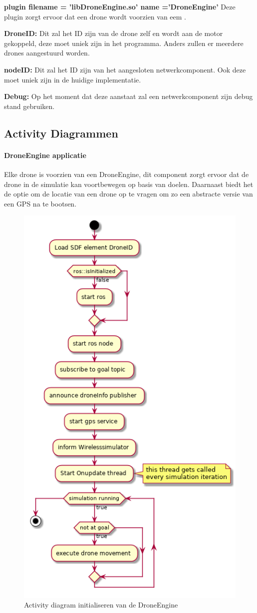 \documentclass[a4paper, 11pt, oneside]{report}
\begin{document}
\textbf{plugin filename = 'libDroneEngine.so' name ='DroneEngine'} Deze plugin zorgt ervoor dat een drone wordt voorzien van eem .


\textbf{DroneID:} Dit zal het ID zijn van de drone zelf en wordt aan de motor gekoppeld, deze moet uniek zijn in het programma. Anders zullen er meerdere drones aangestuurd worden.

\textbf{nodeID:} Dit zal het ID zijn van het aangesloten netwerkcomponent. Ook deze moet uniek zijn in de huidige implementatie. 

\textbf{Debug:} Op het moment dat deze aanstaat zal een netwerkcomponent zijn debug stand gebruiken.



\subsection{Activity Diagrammen}
\label{DetailedDesign:MeshNetwerk:activity}


\paragraph{DroneEngine applicatie}
\label{DetailedDesign:MeshNetwerk:Activity:initaliserenDrone}
Elke drone is voorzien van een DroneEngine, dit component zorgt ervoor dat de drone in de simulatie kan voortbewegen op basis van doelen.
Daarnaast biedt het de optie om de locatie van een drone op te vragen om zo een abstracte versie van een GPS na te bootsen.
\begin{figure}[H]
	\begin{center}\includegraphics[width=.45\linewidth]{UML/out/DroneSimulation/Activity/DroneEngine/DroneEngine.png}\end{center}
	\caption{Activity diagram initialiseren van de DroneEngine}
	\label{fig:communication:MeshNetwerk:Activity:initialiserenDrone}
\end{figure}
\end{document}
